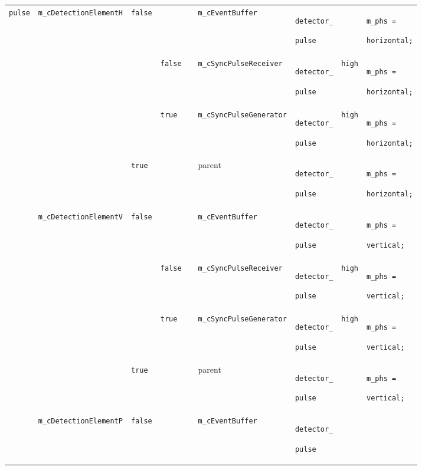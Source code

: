 \begin{footnotesize}
\begin{longtable}[H]{ | m{1.2cm} | m{1.9cm} | m{1.2cm} | l | m{1.5cm} || m{1.8cm} | m{1.4cm} | m{1.2cm} | m{1.7cm} | }
  \texttt{pulse} &
  \texttt{m\_cDetectionElementH} &
  \texttt{false} &
  &
  &
  \texttt{m\_cEventBuffer} &
  \texttt{detector\_} \par \texttt{pulse} &
  &
  \texttt{m\_phs =} \par \texttt{horizontal;} \\
\cline{4-9}
  &
  &
  &
  \texttt{false} &
  &
  \texttt{m\_cSyncPulseReceiver} &
  \texttt{detector\_} \par \texttt{pulse} &
  \texttt{high} &
  \texttt{m\_phs =} \par \texttt{horizontal;} \\
\cline{4-9}
  &
  &
  &
  \texttt{true} &
  &
  \texttt{m\_cSyncPulseGenerator} &
  \texttt{detector\_} \par \texttt{pulse} &
  \texttt{high} &
  \texttt{m\_phs =} \par \texttt{horizontal;} \\
\cline{3-9}
  &
  &
  \texttt{true} &
  &
  &
  parent &
  \texttt{detector\_} \par \texttt{pulse} &
  &
  \texttt{m\_phs =} \par \texttt{horizontal;} \\
\cline{2-9}
  &
  \texttt{m\_cDetectionElementV} &
  \texttt{false} &
  &
  &
  \texttt{m\_cEventBuffer} &
  \texttt{detector\_} \par \texttt{pulse} &
  &
  \texttt{m\_phs =} \par \texttt{vertical;} \\
\cline{4-9}
  &
  &
  &
  \texttt{false} &
  &
  \texttt{m\_cSyncPulseReceiver} &
  \texttt{detector\_} \par \texttt{pulse} &
  \texttt{high} &
  \texttt{m\_phs =} \par \texttt{vertical;} \\
\cline{4-9}
  &
  &
  &
  \texttt{true} &
  &
  \texttt{m\_cSyncPulseGenerator} &
  \texttt{detector\_} \par \texttt{pulse} &
  \texttt{high} &
  \texttt{m\_phs =} \par \texttt{vertical;} \\
\cline{3-9}
  &
  &
  \texttt{true} &
  &
  &
  parent &
  \texttt{detector\_} \par \texttt{pulse} &
  &
  \texttt{m\_phs =} \par \texttt{vertical;} \\
\cline{2-9}
  &
  \texttt{m\_cDetectionElementP} &
  \texttt{false} &
  &
  &
  \texttt{m\_cEventBuffer} &
  \texttt{detector\_} \par \texttt{pulse} &

\end{longtable}
\end{footnotesize}

